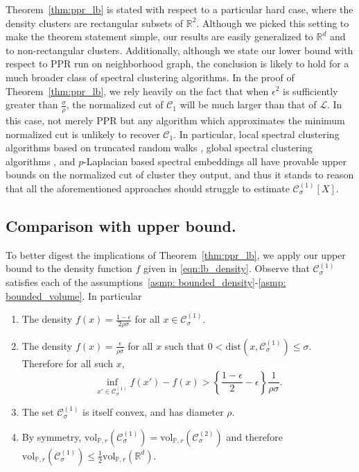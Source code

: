 \documentclass[11pt,twoside]{article}
\newcommand{\vol}{\mathrm{vol}}
\newcommand{\Reals}{\mathbb{R}}
\newcommand{\1}{\mathbf{1}}
\newcommand{\dist}{\mathrm{dist}}
\newcommand{\Xbf}{X}             %
\newcommand{\Pbb}{\mathbb{P}}
\newcommand{\Cset}{\mathcal{C}}
\newcommand{\Csig}{\Cset_{\sigma}}
\begin{document}
Theorem~\ref{thm:ppr_lb} is stated with respect to a particular hard case, where the density clusters are rectangular subsets of $\Reals^2$. Although we picked this setting to make the theorem statement simple, our results are easily generalized to $\Reals^d$ and to non-rectangular clusters. Additionally, although we state our lower bound with respect to PPR run on neighborhood graph, the conclusion is likely to hold for a much broader class of spectral clustering algorithms. In the proof of Theorem~\ref{thm:ppr_lb}, we rely heavily on the fact that when $\epsilon^2$ is sufficiently greater than $\frac{\sigma}{\rho}$, the normalized cut of $\Cset_1$ will be much larger than that of $\mathcal{L}$. In this case, not merely PPR but any algorithm which approximates the minimum normalized cut is unlikely to recover $\Cset_1$. In particular, local spectral clustering algorithms based on truncated random walks \citet{spielman2013}, global spectral clustering algorithms \citet{shi00}, and $p$-Laplacian based spectral embeddings \citet{hein2010} all have provable upper bounds on the normalized cut of cluster they output, and thus it stands to reason that all the aforementioned approaches should struggle to estimate $\Csig^{(1)}[\Xbf]$.

\subsection{Comparison with upper bound.}

To better digest the implications of Theorem~\ref{thm:ppr_lb}, we apply our upper bound to the density function $f$ given in \eqref{eqn:lb_density}. Observe that $\Csig^{(1)}$ satisfies each of the assumptions~\ref{asmp: bounded_density}-\ref{asmp: bounded_volume}. In particular
\begin{enumerate}[label=(A\arabic*)]
	\item The density $f(x) = \frac{1 - \epsilon}{2 \rho \sigma}$ for all $x \in \Csig^{(1)}$.
	\item The density $f(x) = \frac{\epsilon}{\rho\sigma}$ for all $x$ such that $0 < \dist(x,\Csig^{(1)}) \leq \sigma$. Therefore for all such $x$,
	\begin{equation*}
	\inf_{x' \in \Csig^{(1)}} f(x') - f(x)  > \left\{\frac{1 - \epsilon}{2} - \epsilon \right\} \frac{1}{\rho \sigma}.
	\end{equation*}
	\item The set $\Csig^{(1)}$ is itself convex, and has diameter $\rho$.
	\item By symmetry, $\vol_{\Pbb,r}(\Csig^{(1)}) = \vol_{\Pbb,r}(\Csig^{(2)})$ and therefore $\vol_{\Pbb,r}(\Csig^{(1)}) \leq \frac{1}{2}\vol_{\Pbb,r}(\Reals^d)$. 
\end{enumerate}
\end{document}
